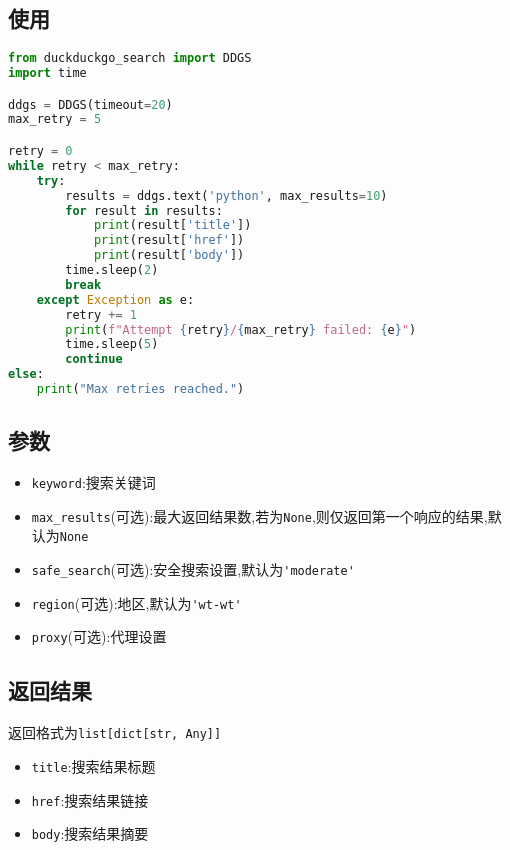 \documentclass[a4paper,12pt]{article}
\begin{document}
\subsection{使用}
\begin{lstlisting}[language=python]
from duckduckgo_search import DDGS
import time

ddgs = DDGS(timeout=20)
max_retry = 5

retry = 0
while retry < max_retry:
    try:
        results = ddgs.text('python', max_results=10)
        for result in results:
            print(result['title'])
            print(result['href'])
            print(result['body'])
        time.sleep(2)
        break
    except Exception as e:
        retry += 1
        print(f"Attempt {retry}/{max_retry} failed: {e}")
        time.sleep(5)
        continue
else:
    print("Max retries reached.")
\end{lstlisting}

\subsection{参数}
\begin{itemize}
    \item \verb|keyword|:搜索关键词
    \item \verb|max_results|(可选):最大返回结果数,若为\verb|None|,则仅返回第一个响应的结果,默认为\verb|None|
    \item \verb|safe_search|(可选):安全搜索设置,默认为\verb|'moderate'|
    \item \verb|region|(可选):地区,默认为\verb|'wt-wt'|
    \item \verb|proxy|(可选):代理设置
\end{itemize}

\subsection{返回结果}
返回格式为\verb|list[dict[str, Any]]|
\begin{itemize}
    \item \verb|title|:搜索结果标题
    \item \verb|href|:搜索结果链接
    \item \verb|body|:搜索结果摘要
\end{itemize}
\end{document}
